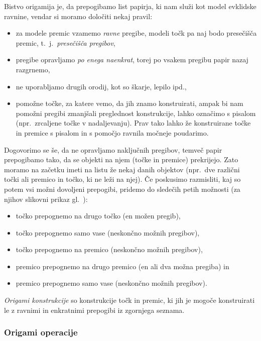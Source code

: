 Bistvo origamija je, da prepogibamo list papirja, ki nam služi kot model evklidske ravnine, vendar si moramo določiti nekaj pravil:
\begin{itemize}
    \item za modele premic vzamemo \emph{ravne} pregibe, modeli točk pa naj bodo presečišča premic, t.\ j.\ \emph{presečišča pregibov},
    \item pregibe opravljamo \emph{po enega naenkrat}, torej po vsakem pregibu papir nazaj razgrnemo,
    \item ne uporabljamo drugih orodij, kot so škarje, lepilo ipd.,
    \item pomožne točke, za katere vemo, da jih znamo konstruirati, ampak bi nam pomožni pregibi zmanjšali preglednost konstrukcije, lahko označimo s pisalom (npr.\ zrcaljene točke v nadaljevanju). Prav tako lahko že konstruirane točke in premice s pisalom in s pomočjo ravnila močneje poudarimo.
\end{itemize}
Dogovorimo se še, da ne opravljamo naključnih pregibov, temveč papir prepogibamo tako, da se objekti na njem (točke in premice) prekrijejo. Zato moramo na začetku imeti na listu že nekaj danih objektov (npr.\ dve različni točki ali premico in točko, ki ne leži na njej). Če poskusimo razmisliti, kaj so potem vsi možni dovoljeni prepogibi, pridemo do sledečih petih možnosti (za njihov slikovni prikaz gl.\ \cite[str.\ 25--26]{hull2020}):
\begin{itemize}
    \item točko prepognemo na drugo točko (en možen pregib),
    \item točko prepognemo samo vase (neskončno možnih pregibov),
    \item točko prepognemo na premico (neskončno možnih pregibov),
    \item premico prepognemo na drugo premico (en ali dva možna pregiba) in
    \item premico prepognemo samo vase (neskončno možnih pregibov).
\end{itemize}

\begin{definicija}
    \label{def:origami_konstruktibilnost}
    \emph{Origami konstrukcije} so konstrukcije točk in premic, ki jih je mogoče konstruirati le z ravnimi in enkratnimi prepogibi iz zgornjega seznama.
\end{definicija}

\subsubsection{Origami operacije}
\label{podpodpogl:operacije}

